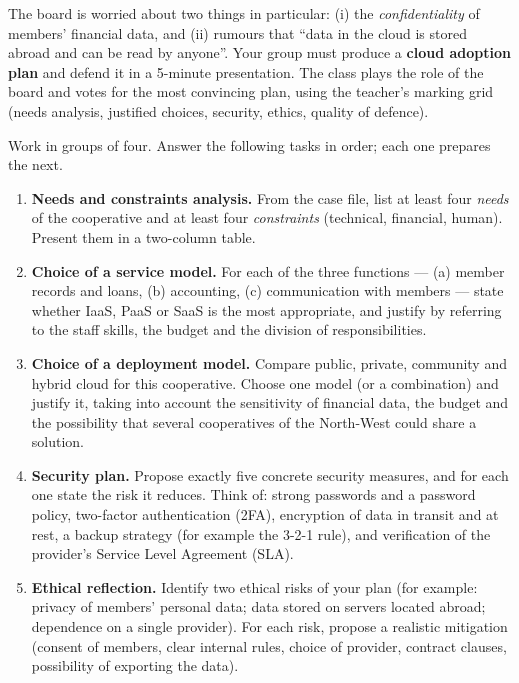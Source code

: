 \documentclass[11pt]{article}
\newcounter{popsec}
\newcounter{popsub}
\newcommand{\courssub}[1]{%
  \stepcounter{popsub}%
  \par\vspace{9pt}\noindent{\popxbold\fontsize{11.5}{13}\selectfont\color{popink}{\color{poporange}\thepopsec.\thepopsub}\hspace{6pt}#1}\par\nopagebreak\vspace{4pt}
}
\begin{document}
The board is worried about two things in particular: (i) the \emph{confidentiality} of members' financial data, and (ii) rumours that ``data in the cloud is stored abroad and can be read by anyone''. Your group must produce a \textbf{cloud adoption plan} and defend it in a 5-minute presentation. The class plays the role of the board and votes for the most convincing plan, using the teacher's marking grid (needs analysis, justified choices, security, ethics, quality of defence).

\courssub{Tasks}

Work in groups of four. Answer the following tasks in order; each one prepares the next.

\begin{enumerate}
\item \textbf{Needs and constraints analysis.} From the case file, list at least four \emph{needs} of the cooperative and at least four \emph{constraints} (technical, financial, human). Present them in a two-column table.

\item \textbf{Choice of a service model.} For each of the three functions --- (a) member records and loans, (b) accounting, (c) communication with members --- state whether IaaS, PaaS or SaaS is the most appropriate, and justify by referring to the staff skills, the budget and the division of responsibilities.

\item \textbf{Choice of a deployment model.} Compare public, private, community and hybrid cloud for this cooperative. Choose one model (or a combination) and justify it, taking into account the sensitivity of financial data, the budget and the possibility that several cooperatives of the North-West could share a solution.

\item \textbf{Security plan.} Propose exactly five concrete security measures, and for each one state the risk it reduces. Think of: strong passwords and a password policy, two-factor authentication (2FA), encryption of data in transit and at rest, a backup strategy (for example the 3-2-1 rule), and verification of the provider's Service Level Agreement (SLA).

\item \textbf{Ethical reflection.} Identify two ethical risks of your plan (for example: privacy of members' personal data; data stored on servers located abroad; dependence on a single provider). For each risk, propose a realistic mitigation (consent of members, clear internal rules, choice of provider, contract clauses, possibility of exporting the data).


\end{enumerate}
\end{document}
